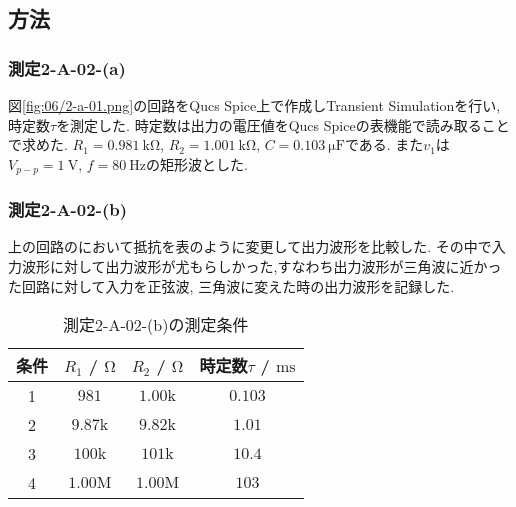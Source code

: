 \subsection{方法}
\subsubsection{測定2-A-02-(a)}
図\ref{fig:06/2-a-01.png}の回路をQucs Spice上で作成しTransient Simulationを行い,時定数$\tau$を測定した.
時定数は出力の電圧値をQucs Spiceの表機能で読み取ることで求めた.
$R_1=0.981\ \si{\kilo\ohm}$, $R_2=1.001\ \si{\kilo\ohm}$, $C=0.103\ \si{\micro\farad}$である.
また$v_1$は$V_{p-p}=1\ \si{\volt}$, $f=80\ \si{\hertz}$の矩形波とした.

\subsubsection{測定2-A-02-(b)}
上の回路のにおいて抵抗を表のように変更して出力波形を比較した.
その中で入力波形に対して出力波形が尤もらしかった,すなわち出力波形が三角波に近かった回路に対して入力を正弦波,
三角波に変えた時の出力波形を記録した.
\begin{table}[h]
\caption{測定2-A-02-(b)の測定条件}
\label{tab:2-A-02-(b)}
\centering
\begin{tabular}{cccc}
\hline
条件&$R_1$ / $\si{\ohm}$&$R_2$ / $\si{\ohm}$&時定数$\tau$ / $\si{\milli\second}$\\
\hline \hline
1&$981$&$1.00\si{\kilo}$&$0.103$\\
2&$9.87\si{\kilo}$&$9.82\si{\kilo}$&$1.01$\\
3&$100\si{\kilo}$&$101\si{\kilo}$&$10.4$\\
4&$1.00\si{\mega}$&$1.00\si{\mega}$&$103$\\
\hline
\end{tabular}
\end{table}